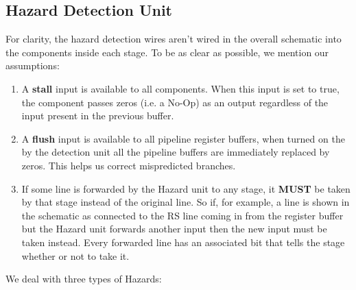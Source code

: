 \documentclass[12pt]{article}
\theoremstyle{plain}
\theoremstyle{definition}
\begin{document}
\subsection{Hazard Detection Unit}
For clarity, the hazard detection wires aren't wired in the overall schematic into the components inside each stage. To be as clear as possible, we mention our assumptions:
\begin{enumerate}
    \item A \textbf{stall} input is available to all components. When this input is set to true, the component passes zeros (i.e. a No-Op) as an output regardless of the input present in the previous buffer.
    \item A \textbf{flush} input is available to all pipeline register buffers, when turned on the by the detection unit all the pipeline buffers are immediately replaced by zeros. This helps us correct mispredicted branches.
    \item If some line is forwarded by the Hazard unit to any stage, it \textbf{MUST} be taken by that stage instead of the original line. So if, for example, a line is shown in the schematic as connected to the RS line coming in from the register buffer but the Hazard unit forwards another input then the new input must be taken instead. Every forwarded line has an associated bit that tells the stage whether or not to take it.
\end{enumerate}
We deal with three types of Hazards:
\end{document}

